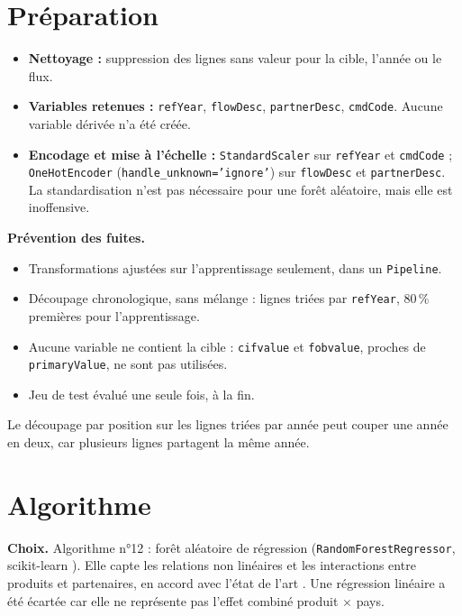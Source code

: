 \documentclass[11pt,a4paper]{article}
\begin{document}
\section{Préparation}\label{sec:prep}
\begin{itemize}[leftmargin=1.2em]
\item \textbf{Nettoyage :} suppression des lignes sans valeur pour la cible, l'année ou le flux.
\item \textbf{Variables retenues :} \texttt{refYear}, \texttt{flowDesc}, \texttt{partnerDesc}, \texttt{cmdCode}. Aucune variable dérivée n'a été créée.
\item \textbf{Encodage et mise à l'échelle :} \texttt{StandardScaler} sur \texttt{refYear} et \texttt{cmdCode} ; \texttt{OneHotEncoder} (\texttt{handle\_unknown='ignore'}) sur \texttt{flowDesc} et \texttt{partnerDesc}. La standardisation n'est pas nécessaire pour une forêt aléatoire, mais elle est inoffensive.
\end{itemize}

\textbf{Prévention des fuites.}
\begin{itemize}[label=$\square$,leftmargin=1.5em]
\item Transformations ajustées sur l'apprentissage seulement, dans un \texttt{Pipeline}.
\item Découpage chronologique, sans mélange : lignes triées par \texttt{refYear}, 80\,\% premières pour l'apprentissage.
\item Aucune variable ne contient la cible : \texttt{cifvalue} et \texttt{fobvalue}, proches de \texttt{primaryValue}, ne sont pas utilisées.
\item Jeu de test évalué une seule fois, à la fin.
\end{itemize}
Le découpage par position sur les lignes triées par année peut couper une année en deux, car plusieurs lignes partagent la même année.

\section{Algorithme}\label{sec:algo}
\textbf{Choix.} Algorithme n°12 : forêt aléatoire de régression (\texttt{RandomForestRegressor}, scikit-learn \cite{sklearn}). Elle capte les relations non linéaires et les interactions entre produits et partenaires, en accord avec l'état de l'art \cite{breiman}. Une régression linéaire a été écartée car elle ne représente pas l'effet combiné produit $\times$ pays.
\end{document}
